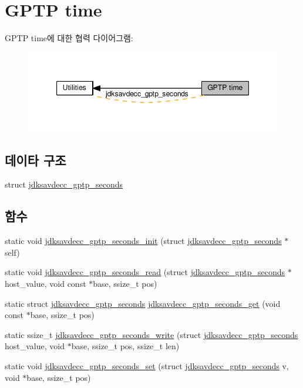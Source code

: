 \hypertarget{group__gptp}{}\section{G\+P\+TP time}
\label{group__gptp}
G\+P\+TP time에 대한 협력 다이어그램\+:
\nopagebreak
\begin{figure}[H]
\begin{center}
\leavevmode
\includegraphics[width=347pt]{group__gptp}
\end{center}
\end{figure}
\subsection*{데이타 구조}
\begin{DoxyCompactItemize}
\item 
struct \hyperlink{structjdksavdecc__gptp__seconds}{jdksavdecc\+\_\+gptp\+\_\+seconds}
\end{DoxyCompactItemize}
\subsection*{함수}
\begin{DoxyCompactItemize}
\item 
static void \hyperlink{group__gptp_gac83b523aced0f9fbb3be4e3b2c583731}{jdksavdecc\+\_\+gptp\+\_\+seconds\+\_\+init} (struct \hyperlink{structjdksavdecc__gptp__seconds}{jdksavdecc\+\_\+gptp\+\_\+seconds} $\ast$self)
\item 
static void \hyperlink{group__gptp_ga8a34243592cdee908a164b5fce707d8c}{jdksavdecc\+\_\+gptp\+\_\+seconds\+\_\+read} (struct \hyperlink{structjdksavdecc__gptp__seconds}{jdksavdecc\+\_\+gptp\+\_\+seconds} $\ast$host\+\_\+value, void const $\ast$base, ssize\+\_\+t pos)
\item 
static struct \hyperlink{structjdksavdecc__gptp__seconds}{jdksavdecc\+\_\+gptp\+\_\+seconds} \hyperlink{group__gptp_ga95810698227a42a0557a91ff528ab8ae}{jdksavdecc\+\_\+gptp\+\_\+seconds\+\_\+get} (void const $\ast$base, ssize\+\_\+t pos)
\item 
static ssize\+\_\+t \hyperlink{group__gptp_gaabc83320ff2c1115d44e531158ce59a4}{jdksavdecc\+\_\+gptp\+\_\+seconds\+\_\+write} (struct \hyperlink{structjdksavdecc__gptp__seconds}{jdksavdecc\+\_\+gptp\+\_\+seconds} host\+\_\+value, void $\ast$base, ssize\+\_\+t pos, ssize\+\_\+t len)
\item 
static void \hyperlink{group__gptp_ga82eb5b004b325e287973dd23f80c8713}{jdksavdecc\+\_\+gptp\+\_\+seconds\+\_\+set} (struct \hyperlink{structjdksavdecc__gptp__seconds}{jdksavdecc\+\_\+gptp\+\_\+seconds} v, void $\ast$base, ssize\+\_\+t pos)
\end{DoxyCompactItemize}


